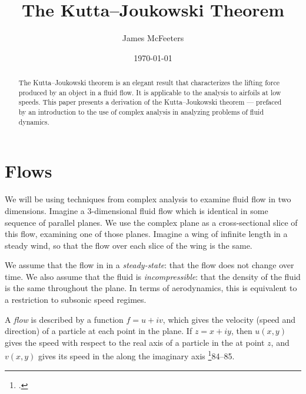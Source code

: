 \documentclass[letterpaper, twoside, 12 pt]{article}
\title{The Kutta--Joukowski Theorem}
\date{\today}
\author{James McFeeters}
\begin{document}
	\maketitle

\begin{abstract}
	The Kutta--Joukowski theorem is an elegant result that characterizes the lifting force produced by an object in a fluid flow. 
	It is applicable to the analysis to airfoils at low speeds.
	This paper presents a derivation of the Kutta--Joukowski theorem --- prefaced by an introduction to the use of complex analysis in analyzing problems of fluid dynamics.
\end{abstract}

\setlength{\parindent}{0 pt}
\setlength{\parskip}{1 em}

\section{Flows} %
\label{sec:flows}
	We will be using techniques from complex analysis to examine fluid flow in two dimensions.
	Imagine a 3-dimensional fluid flow which is identical in some sequence of parallel planes.
	We use the complex plane as a cross-sectional slice of this flow, examining one of those planes.
	Imagine a wing of infinite length in a steady wind, so that the flow over each slice of the wing is the same.

	We assume that the flow in in a \textit{steady-state}: that the flow does not change over time.
	We also assume that the fluid is \textit{incompressible}: that the density of the fluid is the same throughout the plane.
	In terms of aerodynamics, this is equivalent to a restriction to subsonic speed regimes.

	\begin{definition}[Flow]
		A \textit{flow} is described by a function $f = u + iv$, which gives the velocity (speed and direction) of a particle at each point in the plane.
		If $z = x + iy$, then $u(x, y)$ gives the speed with respect to the real axis of a particle in the at point $z$, and $v(x, y)$ gives its speed in the along the imaginary axis \footcite{fisher}{84--85}.
	\end{definition}
\end{document}
